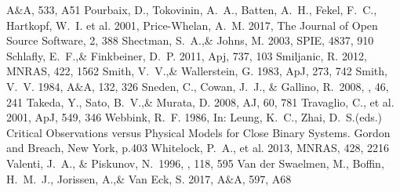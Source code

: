 \documentclass[a4paper,fleqn,usenatbib]{mnras}
\begin{document}
\begin{thebibliography}{99}
A$\&$A, 533, A51
Pourbaix, D., Tokovinin, A.~A., Batten, A.~H., Fekel, F.~C., Hartkopf, W.~I. et al. 2001, 
Price-Whelan, A.~M. 2017, 
The Journal of Open Source Software, 2, 388
Shectman, S.~A.,\& Johns, M. 2003, 
SPIE, 4837, 910
Schlafly, E.~F.,\& Finkbeiner, D.~P. 2011, 
Apj, 737, 103
Smiljanic, R. 2012, 
MNRAS, 422, 1562
Smith, V.~V.,\& Wallerstein, G. 1983, 
ApJ, 273, 742
Smith, V.~V. 1984, 
A$\&$A, 132, 326
 Sneden, C., Cowan, J.~J., \& Gallino, R.\ 2008, \araa, 46, 241 
Takeda, Y., Sato, B.~V.,\& Murata, D. 2008, 
AJ, 60, 781
Travaglio, C., et al. 2001, 
ApJ, 549, 346
Webbink, R.~F. 1986, 
In: Leung, K.~C., Zhai, D.~S.(eds.) Critical Observations versus Physical Models for Close Binary Systems. Gordon and Breach, New York, p.403
Whitelock, P.~A., et al. 2013, 
MNRAS, 428, 2216
 Valenti, J.~A., \& Piskunov, N.\ 1996, \aaps, 118, 595 
Van der Swaelmen, M., Boffin, H.~M.~J., Jorissen, A.,\& Van Eck, S. 2017, 
A$\&$A, 597, A68


\end{thebibliography}


\bsp	%
\label{lastpage}
\end{document}
